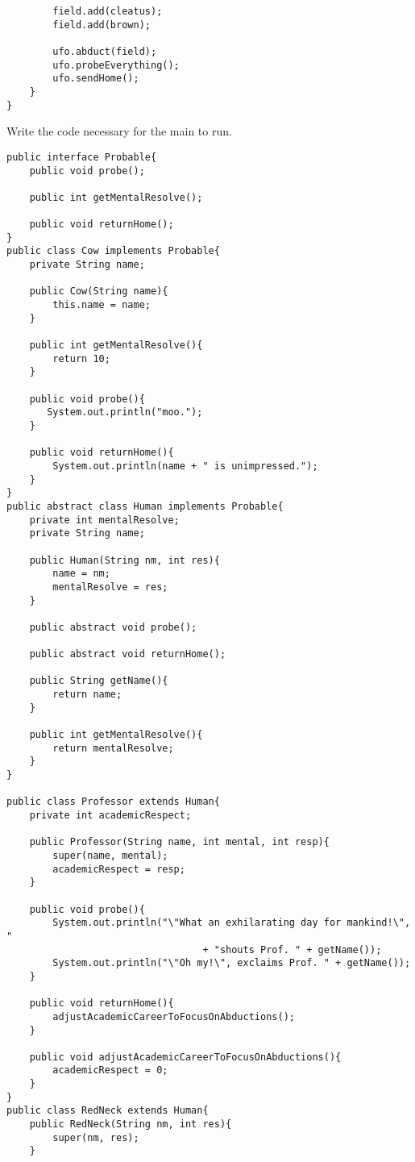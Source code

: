 \documentclass[11pt]{article}
\newenvironment{answer}{\large\lstset{basicstyle=\large}\color{white}}{}
\newenvironment{answer}{\large\lstset{basicstyle=\large}\color{red}}{}
\begin{document}
\begin{enumerate}
\begin{lstlisting}
        field.add(cleatus);
        field.add(brown);

        ufo.abduct(field);
        ufo.probeEverything();
        ufo.sendHome();
    }
}
\end{lstlisting}
Write the code necessary for the main to run.
\begin{answer}
\begin{lstlisting}
public interface Probable{
    public void probe();

    public int getMentalResolve();

    public void returnHome();
}
public class Cow implements Probable{
    private String name;

    public Cow(String name){
        this.name = name;
    }

    public int getMentalResolve(){
        return 10;
    }

    public void probe(){
       System.out.println("moo.");
    }

    public void returnHome(){
        System.out.println(name + " is unimpressed.");
    }
}
public abstract class Human implements Probable{
    private int mentalResolve;
    private String name;

    public Human(String nm, int res){
        name = nm;
        mentalResolve = res;
    }

    public abstract void probe();

    public abstract void returnHome();

    public String getName(){
        return name;
    }

    public int getMentalResolve(){
        return mentalResolve;
    }
}

public class Professor extends Human{
    private int academicRespect;

    public Professor(String name, int mental, int resp){
        super(name, mental);
        academicRespect = resp;
    }

    public void probe(){
        System.out.println("\"What an exhilarating day for mankind!\", "
                                  + "shouts Prof. " + getName());
        System.out.println("\"Oh my!\", exclaims Prof. " + getName());
    }

    public void returnHome(){
        adjustAcademicCareerToFocusOnAbductions();
    }

    public void adjustAcademicCareerToFocusOnAbductions(){
        academicRespect = 0;
    }
}
public class RedNeck extends Human{
    public RedNeck(String nm, int res){
        super(nm, res);
    }


\end{lstlisting}
\end{answer}
\end{enumerate}
\end{document}
